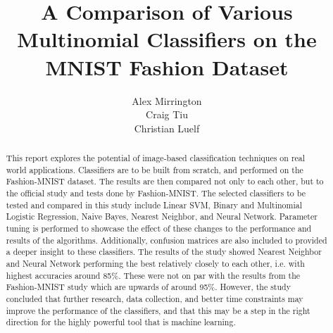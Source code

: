 \documentclass[11pt,a4paper]{article}
\author{Alex Mirrington\\Craig Tiu\\Christian Luelf}
\title{A Comparison of Various Multinomial Classifiers on the\\MNIST Fashion Dataset}
\begin{document}
\maketitle
\tableofcontents

\pagebreak

\begin{abstract}
\noindent This report explores the potential of image-based classification techniques on real world applications. Classifiers are to be built from scratch, and performed on the Fashion-MNIST dataset. The results are then compared not only to each other, but to the official study and tests done by Fashion-MNIST. The selected classifiers to be tested and compared in this study include Linear SVM, Binary and Multinomial Logistic Regression, Naive Bayes, Nearest Neighbor, and Neural Network. Parameter tuning is performed to showcase the effect of these changes to the performance and results of the algorithms. Additionally, confusion matrices are also included to provided a deeper insight to these classifiers. The results of the study showed Nearest Neighbor and Neural Network performing the best relatively closely to each other, i.e. with highest accuracies around 85\%. These were not on par with the results from the Fashion-MNIST study which are upwards of around 95\%. However, the study concluded that further research, data collection, and better time constraints may improve the performance of the classifiers, and that this may be a step in the right direction for the highly powerful tool that is machine learning.
\end{abstract}

\pagebreak




\end{document}
